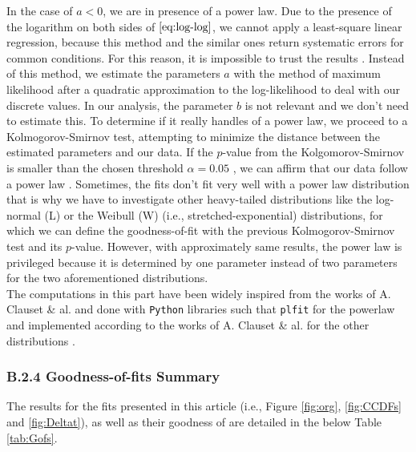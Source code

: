 \documentclass[unnumsec,webpdf,contemporary,large]{oup-authoring-template}%
\theoremstyle{thmstyleone}%
\theoremstyle{thmstyletwo}%
\theoremstyle{thmstylethree}%
\begin{document}
\begin{appendices}
    In the case of $a<0$, we are in presence of a power law. Due to the presence of the logarithm on both sides of $\eqref{eq:log-log}$, we cannot apply a least-square linear regression, because this method and the similar ones return systematic errors for common conditions. For this reason, it is impossible to trust the results \cite{clauset_power-law_2009}. Instead of this method, we estimate the parameters $a$ with the method of maximum likelihood after a quadratic approximation to the log-likelihood to deal with our discrete values. In our analysis, the parameter $b$ is not relevant and we don't need to estimate this. To determine if it really handles of a power law, we proceed to a Kolmogorov-Smirnov test, attempting to minimize the distance between the estimated parameters and our data. If the $p$-value from the Kolgomorov-Smirnov is smaller than the chosen threshold $\alpha = 0.05$ , we can affirm that our data follow a power law \cite{clauset_power-law_2009}.
    Sometimes, the fits don't fit very well with a power law distribution that is why we have to investigate other heavy-tailed distributions like the log-normal (L) or the Weibull (W) (i.e., stretched-exponential) distributions, for which we can define the goodness-of-fit with the previous Kolmogorov-Smirnov test and its $p$-value. However, with approximately same results, the power law is privileged because it is determined by one parameter instead of two parameters for the two aforementioned distributions.\\
    The computations in this part have been widely inspired from the works of A. Clauset \& al.  and done with \verb?Python? libraries such that \verb?plfit? for the powerlaw and implemented according to the works of A. Clauset \& al. for the other distributions \cite{clauset_power-law_2009}.\\
   
\subsubsection{B.2.4 Goodness-of-fits Summary}
\label{subsub:GofS}

The results for the fits presented in this article (i.e., Figure \ref{fig:org}, \ref{fig:CCDFs} and \ref{fig:Deltat}), as well as their goodness of are detailed in the below Table \ref{tab:Gofs}.

\end{appendices}

%
%
\end{document}
